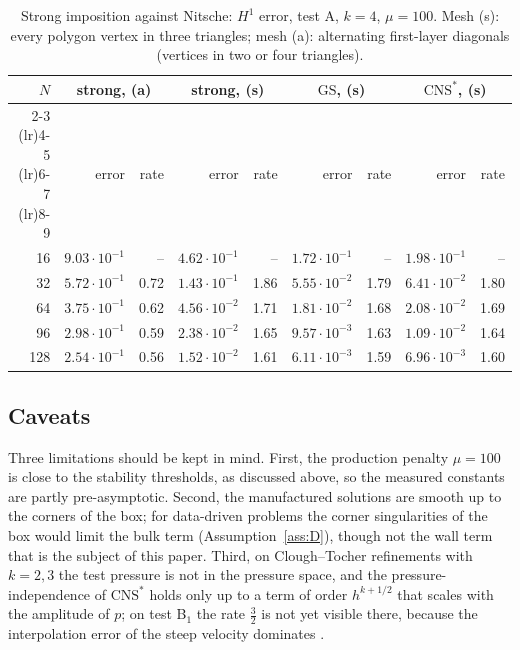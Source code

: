 \documentclass[pdflatex,sn-mathphys-num]{sn-jnl}
\theoremstyle{thmstyleone}
\theoremstyle{thmstylethree}
\newcommand{\GS}{\mathrm{GS}}
\newcommand{\CNS}{\mathrm{CNS}^\ast}
\begin{document}
\begin{table}[t]
\centering\small
\caption{Strong imposition against Nitsche: $H^1$ error, test A, $k=4$, $\mu=100$. Mesh (s): every polygon vertex in three triangles; mesh (a): alternating first-layer diagonals (vertices in two or four triangles).}\label{tab:strong}
\begin{tabular}{rrrrrrrrr}
\toprule
$N$ & \multicolumn{2}{c}{strong, (a)} & \multicolumn{2}{c}{strong, (s)} & \multicolumn{2}{c}{$\GS$, (s)} & \multicolumn{2}{c}{$\CNS$, (s)}\\
\cmidrule(lr){2-3} \cmidrule(lr){4-5} \cmidrule(lr){6-7} \cmidrule(lr){8-9}
 & error & rate & error & rate & error & rate & error & rate\\
\midrule
16 & $9.03\cdot10^{-1}$ & -- & $4.62\cdot10^{-1}$ & -- & $1.72\cdot10^{-1}$ & -- & $1.98\cdot10^{-1}$ & --\\
32 & $5.72\cdot10^{-1}$ & 0.72 & $1.43\cdot10^{-1}$ & 1.86 & $5.55\cdot10^{-2}$ & 1.79 & $6.41\cdot10^{-2}$ & 1.80\\
64 & $3.75\cdot10^{-1}$ & 0.62 & $4.56\cdot10^{-2}$ & 1.71 & $1.81\cdot10^{-2}$ & 1.68 & $2.08\cdot10^{-2}$ & 1.69\\
96 & $2.98\cdot10^{-1}$ & 0.59 & $2.38\cdot10^{-2}$ & 1.65 & $9.57\cdot10^{-3}$ & 1.63 & $1.09\cdot10^{-2}$ & 1.64\\
128 & $2.54\cdot10^{-1}$ & 0.56 & $1.52\cdot10^{-2}$ & 1.61 & $6.11\cdot10^{-3}$ & 1.59 & $6.96\cdot10^{-3}$ & 1.60\\
\bottomrule
\end{tabular}
\end{table}

\subsection{Caveats}
Three limitations should be kept in mind. First, the production penalty $\mu=100$ is close to the stability thresholds, as discussed above, so the measured constants are partly pre-asymptotic. Second, the manufactured solutions are smooth up to the corners of the box; for data-driven problems the corner singularities of the box would limit the bulk term (Assumption~\ref{ass:D}), though not the wall term that is the subject of this paper. Third, on Clough--Tocher refinements with $k=2,3$ the test pressure is not in the pressure space, and the pressure-independence of $\CNS$ holds only up to a term of order $h^{k+1/2}$ that scales with the amplitude of $p$; on test B$_1$ the rate $\frac32$ is not yet visible there, because the interpolation error of the steep velocity dominates \cite{PadhiExt}.
\end{document}
